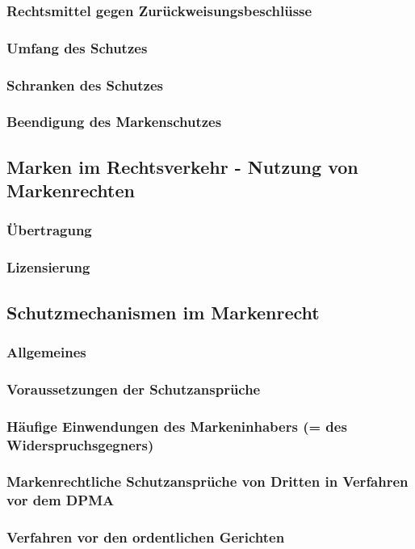 \documentclass{report}
\begin{document}
\subsubsection{Rechtsmittel gegen Zurückweisungsbeschlüsse}
\subsubsection{Umfang des Schutzes}
\subsubsection{Schranken des Schutzes}
\subsubsection{Beendigung des Markenschutzes}
\subsection{Marken im Rechtsverkehr - Nutzung von Markenrechten}
\subsubsection{Übertragung}
\subsubsection{Lizensierung}
\subsection{Schutzmechanismen im Markenrecht}
\subsubsection{Allgemeines}
\subsubsection{Voraussetzungen der Schutzansprüche}
\subsubsection{Häufige Einwendungen des Markeninhabers (= des Widerspruchsgegners)}
\subsubsection{Markenrechtliche Schutzansprüche von Dritten in Verfahren vor dem DPMA}
\subsubsection{Verfahren vor den ordentlichen Gerichten}
\end{document}
